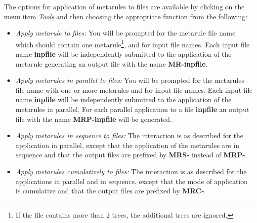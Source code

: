 The options for application of metarules to files are available by clicking
on the menu item {\it Tools} and then choosing the appropriate function
from the following:

\begin{itemize}
\item   {\it Apply metarule to files:}  
        You will be prompted for the metarule file name which should contain
        one metarule\footnote{If the file contains more than 2 trees, the
        additional trees are ignored.}, and for input file names.  Each input
        file name {\bf inpfile} will be independently submitted to the
        application of the metarule generating an output file with the name
        {\bf MR-inpfile}.

\item   {\it Apply metarules in parallel to files:}
        You will be prompted for the metarules file name with one or more 
        metarules and for input file names.
        Each input file name {\bf inpfile} will be independently submitted to 
        the application of the metarules in parallel. For each parallel 
        application to a file {\bf inpfile} an output file with the 
        name    {\bf MRP-inpfile} will be generated.

\item   {\it Apply metarules in sequence to files:}  
        The interaction is as described for the application in parallel, 
        except that
        the application of the metarules are in sequence and that 
        the output files are prefixed by {\bf MRS-} instead of {\bf MRP-}.

\item   {\it Apply metarules cumulatively to files:}  
        The interaction is as described for the applications in parallel
        and in sequence, except that the mode of application is cumulative
        and that the output files are prefixed by {\bf MRC-}.
\end{itemize}


